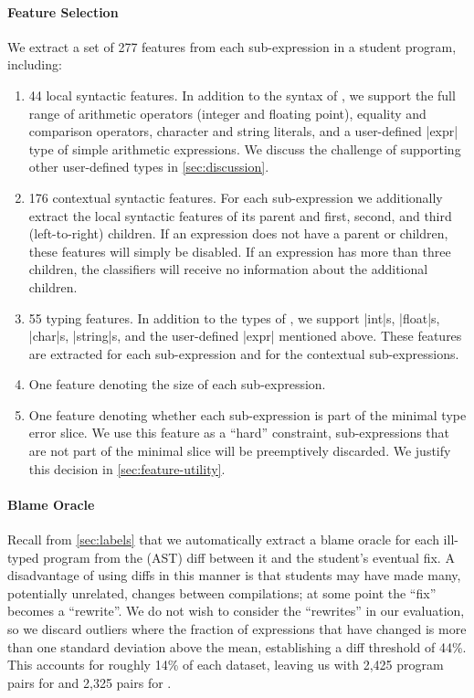 \paragraph{Feature Selection}
We extract a set of 277 features from each sub-expression in a student
program, including:
%
\begin{enumerate}
\item 44 local syntactic features. In addition to the syntax of \lang,
  we support the full range of arithmetic operators (integer and
  floating point), equality and comparison operators, character and
  string literals, and a user-defined |expr| type of simple arithmetic
  expressions. We discuss the challenge of supporting other
  user-defined types in \autoref{sec:discussion}.
\item 176 contextual syntactic features. For each sub-expression we
  additionally extract the local syntactic features of its parent and
  first, second, and third (left-to-right) children. If an expression
  does not have a parent or children, these features will simply be
  disabled. If an expression has more than three children, the
  classifiers will receive no information about the additional
  children.
\item 55 typing features. In addition to the types of \lang, we support
  |int|s, |float|s, |char|s, |string|s, and the user-defined |expr|
  mentioned above. These features are extracted for each sub-expression
  and for the contextual sub-expressions.
\item One feature denoting the size of each sub-expression.
\item One feature denoting whether each sub-expression is part of the
  minimal type error slice. We use this feature as a ``hard''
  constraint, sub-expressions that are not part of the minimal slice
  will be preemptively discarded. We justify this decision in
  \autoref{sec:feature-utility}.
\end{enumerate}

\paragraph{Blame Oracle}
Recall from \autoref{sec:labels} that we automatically extract a blame
oracle for each ill-typed program from the (AST) diff between it and the
student's eventual fix.
%
A disadvantage of using diffs in this manner is that students may have
made many, potentially unrelated, changes between compilations; at some
point the ``fix'' becomes a ``rewrite''.
%
We do not wish to consider the ``rewrites'' in our evaluation, so we
discard outliers where the fraction of expressions that have changed is
more than one standard deviation above the mean, establishing a diff
threshold of 44\%.
%
This accounts for roughly 14\% of each dataset, leaving us with
2,425 program pairs for \SPRING and 2,325 pairs for \FALL.

